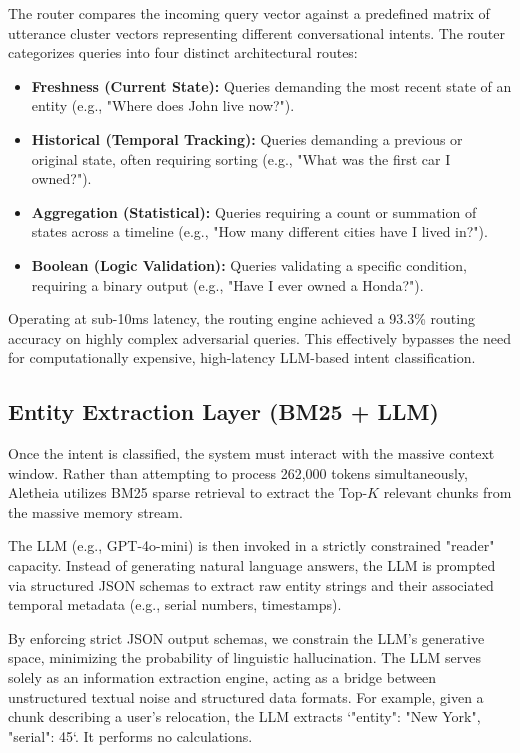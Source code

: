 \documentclass[journal,10pt]{IEEEtran}
\begin{document}
The router compares the incoming query vector against a predefined matrix of utterance cluster vectors representing different conversational intents. The router categorizes queries into four distinct architectural routes:
\begin{itemize}
    \item \textbf{Freshness (Current State):} Queries demanding the most recent state of an entity (e.g., "Where does John live now?").
    \item \textbf{Historical (Temporal Tracking):} Queries demanding a previous or original state, often requiring sorting (e.g., "What was the first car I owned?").
    \item \textbf{Aggregation (Statistical):} Queries requiring a count or summation of states across a timeline (e.g., "How many different cities have I lived in?").
    \item \textbf{Boolean (Logic Validation):} Queries validating a specific condition, requiring a binary output (e.g., "Have I ever owned a Honda?").
\end{itemize}
Operating at sub-10ms latency, the routing engine achieved a 93.3\% routing accuracy on highly complex adversarial queries. This effectively bypasses the need for computationally expensive, high-latency LLM-based intent classification.

\subsection{Entity Extraction Layer (BM25 + LLM)}
Once the intent is classified, the system must interact with the massive context window. Rather than attempting to process 262,000 tokens simultaneously, Aletheia utilizes BM25 sparse retrieval to extract the Top-$K$ relevant chunks from the massive memory stream. 

The LLM (e.g., GPT-4o-mini) is then invoked in a strictly constrained "reader" capacity. Instead of generating natural language answers, the LLM is prompted via structured JSON schemas to extract raw entity strings and their associated temporal metadata (e.g., serial numbers, timestamps). 

By enforcing strict JSON output schemas, we constrain the LLM's generative space, minimizing the probability of linguistic hallucination. The LLM serves solely as an information extraction engine, acting as a bridge between unstructured textual noise and structured data formats. For example, given a chunk describing a user's relocation, the LLM extracts `{"entity": "New York", "serial": 45}`. It performs no calculations.
\end{document}
